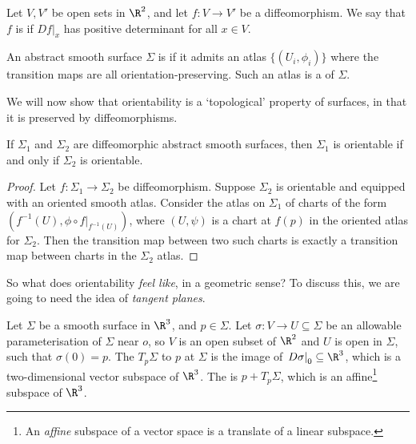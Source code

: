\begin{definition}
    Let $V, V'$ be open sets in $\R^2$, and let $f: V \rightarrow V'$ be a diffeomorphism. We say that $f$ is  if $\left. Df\right|_x$ has positive determinant for all $x \in V$.
\end{definition}

\begin{definition}[Orientability]
An abstract smooth surface $\Sigma$ is  if it admits an atlas $\{(U_i, \phi_i)\}$ where the transition maps are all orientation-preserving. Such an atlas is a  of $\Sigma$.
\end{definition}

We will now show that orientability is a `topological' property of surfaces, in that it is preserved by diffeomorphisms.

\begin{theorem}
    If $\Sigma_1$ and $\Sigma_2$ are diffeomorphic abstract smooth surfaces, then $\Sigma_1$ is orientable if and only if $\Sigma_2$ is orientable.
\end{theorem}
\begin{proof}
    Let $f: \Sigma_1 \rightarrow \Sigma_2$ be diffeomorphism. Suppose $\Sigma_2$ is orientable and equipped with an oriented smooth atlas. Consider the atlas on $\Sigma_1$ of charts of the form $(f^{-1}(U), \phi \circ \left.f\right|_{f^{-1}(U)})$, where $(U, \psi)$ is a chart at $f(p)$ in the oriented atlas for $\Sigma_2$. Then the transition map between two such charts is exactly a transition map between charts in the $\Sigma_2$ atlas. 
\end{proof}

So what does orientability \emph{feel like}, in a geometric sense? To discuss this, we are going to need the idea of \emph{tangent planes}.

\begin{definition}
Let $\Sigma$ be a smooth surface in $\R^3$, and $p \in \Sigma$. Let $\sigma: V \rightarrow U \subseteq \Sigma$ be an allowable parameterisation of $\Sigma$ near $o$, so $V$ is an open subset of $\R^2$ and $U$ is open in $\Sigma$, such that $\sigma(0) = p$. The  $T_p \Sigma$ to $p$ at $\Sigma$ is the image of $\left.D\sigma \right|_0 \subseteq \R^3$, which is a two-dimensional vector subspace of $\R^3$. The  is $p + T_p \Sigma$, which is an affine\footnote{An \emph{affine} subspace of a vector space is a translate of a linear subspace.} subspace of $\R^3$.
\end{definition}


